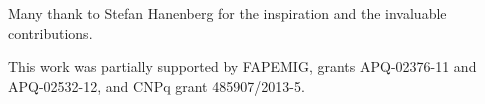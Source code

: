 \documentclass[]{sigplanconf}
\begin{document}

\acks
Many thank to Stefan Hanenberg for the inspiration and the invaluable contributions.

This work was partially supported by FAPEMIG, grants APQ-02376-11 and APQ-02532-12, and CNPq grant 485907/2013-5.

\end{document}
